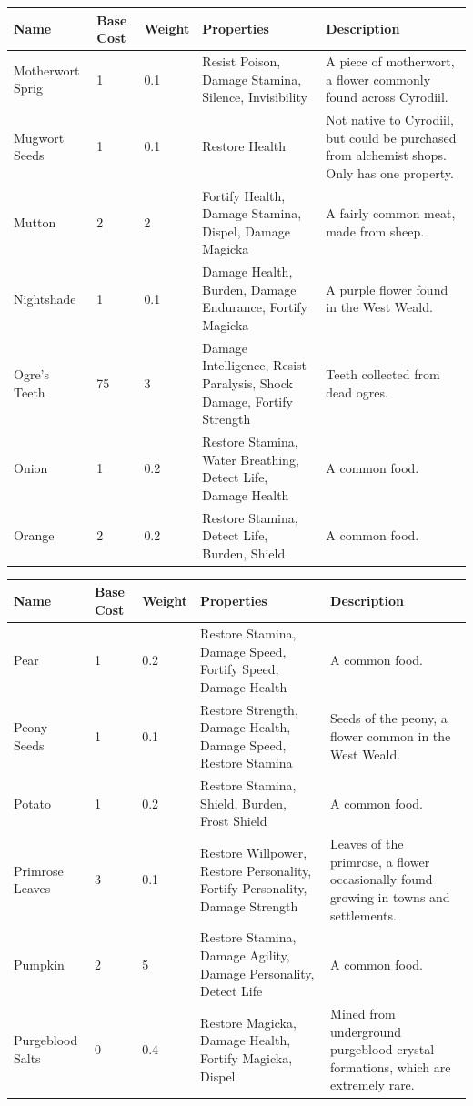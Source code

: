 \documentclass[12pt]{book}
\begin{document}
\begin{tabular}{|p{}|p{}|p{}|p{}|p{}|}
\hline
Name & Base Cost & Weight & Properties & Description\\ \hline
Motherwort Sprig & 1 & 0.1 & Resist Poison, Damage Stamina, Silence, Invisibility & A piece of motherwort, a flower commonly found across Cyrodiil.\\ \hline
Mugwort Seeds & 1 & 0.1 & Restore Health & Not native to Cyrodiil, but could be purchased from alchemist shops. Only has one property.\\ \hline
Mutton & 2 & 2 & Fortify Health, Damage Stamina, Dispel, Damage Magicka & A fairly common meat, made from sheep.\\ \hline
Nightshade & 1 & 0.1 & Damage Health, Burden, Damage Endurance, Fortify Magicka & A purple flower found in the West Weald.\\ \hline
Ogre's Teeth & 75 & 3 & Damage Intelligence, Resist Paralysis, Shock Damage, Fortify Strength & Teeth collected from dead ogres.\\ \hline
Onion & 1 & 0.2 & Restore Stamina, Water Breathing, Detect Life, Damage Health & A common food.\\ \hline
Orange & 2 & 0.2 & Restore Stamina, Detect Life, Burden, Shield & A common food.\\ \hline
\end{tabular}

\begin{tabular}{|p{}|p{}|p{}|p{}|p{}|}
\hline
Name & Base Cost & Weight & Properties & Description\\ \hline
Pear & 1 & 0.2 & Restore Stamina, Damage Speed, Fortify Speed, Damage Health & A common food.\\ \hline
Peony Seeds & 1 & 0.1 & Restore Strength, Damage Health, Damage Speed, Restore Stamina & Seeds of the peony, a flower common in the West Weald.\\ \hline
Potato & 1 & 0.2 & Restore Stamina, Shield, Burden, Frost Shield & A common food.\\ \hline
Primrose Leaves & 3 & 0.1 & Restore Willpower, Restore Personality, Fortify Personality, Damage Strength & Leaves of the primrose, a flower occasionally found growing in towns and settlements.\\ \hline
Pumpkin & 2 & 5 & Restore Stamina, Damage Agility, Damage Personality, Detect Life & A common food.\\ \hline
Purgeblood Salts & 0 & 0.4 & Restore Magicka, Damage Health, Fortify Magicka, Dispel & Mined from underground purgeblood crystal formations, which are extremely rare.\\ \hline
\end{tabular}
\end{document}
